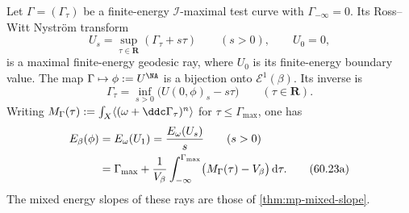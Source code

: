 \begin{theorem}\label{thm:mp-dxz-common-locus}
Let $\Gamma=(\Gamma_\tau)$ be a finite-energy $\mathcal I$-maximal test curve with $\Gamma_{-\infty}=0$. Its Ross--Witt Nystr\"om transform
\[
 U_s=\sup_{\tau\in\mathbf R}(\Gamma_\tau+s\tau)\qquad(s>0),
 \qquad U_0=0,
\]
is a maximal finite-energy geodesic ray, where $U_0$ is its finite-energy boundary value. The map $\Gamma\mapsto\phi:=U^{\NA}$ is a bijection onto $\mathcal E^1(\beta)$. Its inverse is
\[
 \Gamma_\tau=\inf_{s>0}\bigl(U(0,\phi)_s-s\tau\bigr)
             \qquad(\tau\in\mathbf R).
\tag{60.23i}\label{eq:mp-test-curve-inverse}
\]
Writing $M_\Gamma(\tau):=\int_X\langle(\omega+\ddc\Gamma_\tau)^n\rangle$ for $\tau\leq\Gamma_{\max}$, one has
\begin{align}
 E_\beta(\phi)
 &=E_\omega(U_1)=\frac{E_\omega(U_s)}s\qquad(s>0)\notag\\
 &=\Gamma_{\max}
   +\frac1{V_\beta}\int_{-\infty}^{\Gamma_{\max}}
                    \bigl(M_\Gamma(\tau)-V_\beta\bigr)\,\mathrm{d}\tau.
\tag{60.23a}\label{eq:mp-test-curve-energy}
\end{align}
The mixed energy slopes of these rays are those of \cref{thm:mp-mixed-slope}.
\end{theorem}

